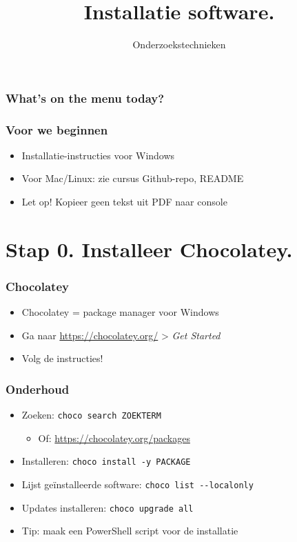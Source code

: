 \documentclass[aspectratio=169]{beamer}
\title{Installatie software.}
\subtitle{Onderzoekstechnieken}
\begin{document}
\begin{frame}
  \maketitle
\end{frame}

\begin{frame}
  \frametitle{What's on the menu today?}

  \tableofcontents
\end{frame}

\begin{frame}
  \frametitle{Voor we beginnen}

  \begin{itemize}
    \item Installatie-instructies voor Windows
    \item Voor Mac/Linux: zie cursus Github-repo, README
    \item Let op! Kopieer geen tekst uit PDF naar console
  \end{itemize}

\end{frame}

\section{Stap 0. Installeer Chocolatey.}

\begin{frame}
  \frametitle{Chocolatey}

  \begin{itemize}
    \item Chocolatey = package manager voor Windows
    \item Ga naar \url{https://chocolatey.org/} > \emph{Get Started}
    \item Volg de instructies!
  \end{itemize}

\end{frame}

\begin{frame}[fragile]
  \frametitle{Onderhoud}

  \begin{itemize}
    \item Zoeken: \verb|choco search ZOEKTERM|
    \begin{itemize}
      \item Of: \url{https://chocolatey.org/packages}
    \end{itemize}
    \item Installeren: \verb|choco install -y PACKAGE|
    \item Lijst geïnstalleerde software: \verb|choco list --localonly|
    \item Updates installeren: \verb|choco upgrade all|
    \item Tip: maak een PowerShell script voor de installatie
  \end{itemize}

\end{frame}
\end{document}
